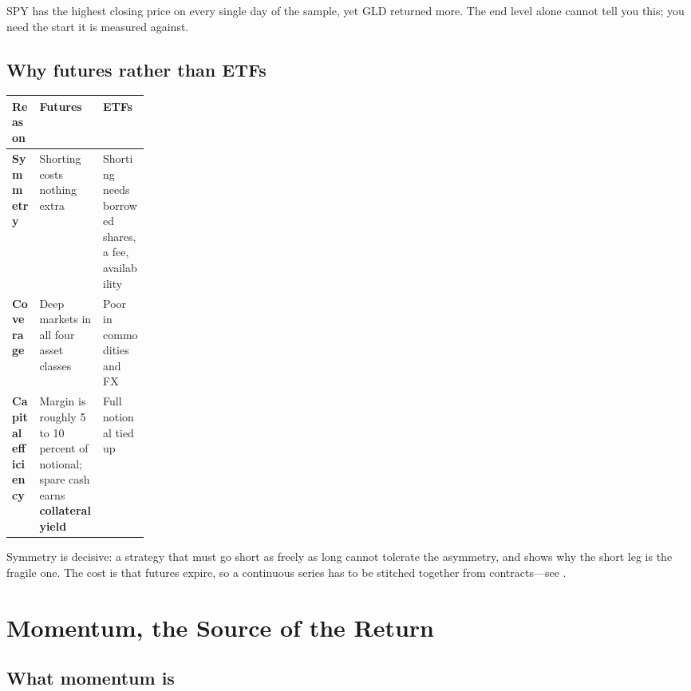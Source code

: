 SPY has the highest closing price on every single day of the sample, yet GLD returned more. The end
level alone cannot tell you this; you need the start it is measured against.


\subsection{Why futures rather than ETFs}\label{sec:why-futures}

\begin{tabularx}{\linewidth}{|>{\raggedright\arraybackslash}p{0.20\linewidth}|X|X|}
\hline
\textbf{Reason} & \textbf{Futures} & \textbf{ETFs} \\ \hline
\textbf{Symmetry}
  & Shorting costs nothing extra
  & Shorting needs borrowed shares, a fee, availability \\ \hline
\textbf{Coverage}
  & Deep markets in all four asset classes
  & Poor in commodities and FX \\ \hline
\textbf{Capital efficiency}
  & Margin is roughly 5 to 10 percent of notional; spare cash earns \textbf{collateral yield}
  & Full notional tied up \\ \hline
\end{tabularx}

Symmetry is decisive: a strategy that must go short as freely as long cannot tolerate the
asymmetry, and  shows why the short leg is the fragile one. The cost is
that futures expire, so a continuous series has to be stitched together from
contracts---see .


\section{Momentum, the Source of the Return}\label{sec:momentum}

\subsection{What momentum is}\label{sec:what-momentum-is}


